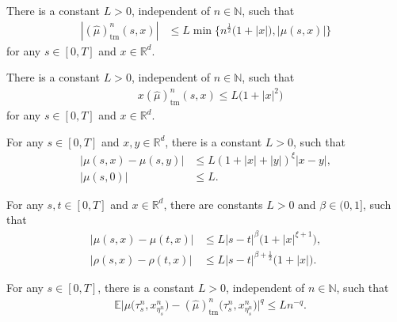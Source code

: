 \documentclass[10pt,a4paper]{amsart}
\newcommand{\E}{\mathbb E}
\begin{document}
\begin{asump} \label{asum:tame}
	There is
	a constant $L>0$, independent of $n\in\mathbb N$, such that 
	\begin{align*}
		|(\widehat{\mu})_{\mathrm{tm}}^{n}(s,x)|&\leq   L \min\big\{n^{\frac{1}{2}}\big(1+|x|\big),|\mu(s,x)|\big\}
	\end{align*}
	for any  $s\in[0,T]$ and $x\in\mathbb R^d$.
\end{asump}

\begin{asump} \label{asum:coercivity_scm}
	There is a constant \( L>0 \), independent of $n\in \mathbb N$, such that
	\begin{align*}
		& x(\widehat{\mu})_{\mathrm{tm}}^{n}(s,x)	 \leq L\big(1+|x|^2)
	\end{align*}
	for any $s\in[0,T]$ and $x\in\mathbb R^d$.
\end{asump}

\begin{asump} \label{asum:poly_lip_drift}
	For any $s\in[0, T]$ and $x, y\in\mathbb R^d$, there is a constant $L>0$,  such that 
	\begin{align*}
		|\mu(s,x)-\mu(s,y)|
		&\leq L \left(1+|x|+|y|\right)^{\xi}|x-y|,
		\\
		|\mu(s,0)|
		&\leq L.
	\end{align*}
\end{asump}

\begin{asump}  \label{asum:holder_time_diffusion_jump}
	For any  $s,t\in[0,T]$ and  $x\in\mathbb R^d$, there are    constants $L>0$ and $\beta\in (0,1]$,   such that
	\begin{align*}
		|{\mu}(s,x)-{\mu}(t,x)|&\leq L|s-t|^{\beta} \big(1+|x|^{\xi+1}\big),
		\\
		|{\rho}(s,x)-{\rho}(t,x)|&\leq L|s-t|^{\beta+\frac{1}{2}} \big(1+|x|\big).
	\end{align*}
\end{asump} 

\begin{asump} \label{asum:convergence}
	For any  $s\in[0,T]$,  there 
	is
	a constant $L>0$,   independent of $n\in\mathbb N$,    such that 
	\begin{align*}
		&\E\big|\mu\big(\tau^n_s,x_{\eta^n_s}^{n}\big) -(\widehat\mu)_{\mathrm{tm}}^{n}\big(\tau^n_s,x_{\eta^n_s}^{n}\big)\big|^{q}
		\leq L n^{-q}.
	\end{align*}
\end{asump}
\end{document}
